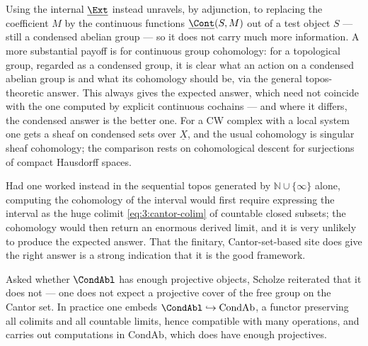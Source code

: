 \begin{remark}
\label{rmk:3:internal-and-group}
Using the internal $\underline{\Ext}$ instead unravels, by adjunction, to
replacing the coefficient $M$ by the continuous functions
$\underline{\Cont}(S,M)$ out of a test object $S$ --- still a condensed abelian
group --- so it does not carry much more information. A more
substantial payoff is for continuous group cohomology: for a topological group,
regarded as a condensed group, it is clear what an action on a condensed abelian
group is and what its cohomology should be, via the general topos-theoretic
answer. This always gives the expected answer, which need not coincide with the
one computed by explicit continuous cochains --- and where it differs, the
condensed answer is the better one. For a CW complex with a local system one gets
a sheaf on condensed sets over $\underline{X}$, and the usual cohomology is
singular sheaf cohomology; the comparison rests on cohomological descent for
surjections of compact Hausdorff spaces.
\end{remark}

\begin{remark}
\label{rmk:3:sequential-topos-bad}
Had one worked instead in the sequential topos generated by
$\mathbb{N}\cup\{\infty\}$ alone, computing the cohomology of the interval would
first require expressing the interval as the huge colimit
\eqref{eq:3:cantor-colim} of countable closed subsets; the cohomology would then
return an enormous derived limit, and it is very unlikely to produce the expected
answer. That the finitary, Cantor-set-based site does give the right answer is a
strong indication that it is the good framework.
\end{remark}

\begin{remark}
\label{rmk:3:enough-projectives-closing}
Asked whether $\CondAbl$ has enough projective objects, Scholze reiterated that
it does not --- one does not expect a projective cover of the free group on the
Cantor set. In practice one embeds $\CondAbl\hookrightarrow\mathrm{CondAb}$, a
functor preserving all colimits and all countable limits, hence compatible with
many operations, and carries out computations in $\mathrm{CondAb}$, which does
have enough projectives.
\end{remark}
